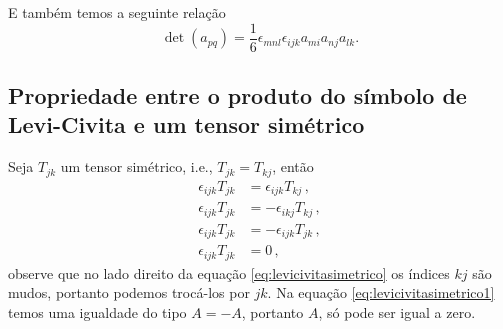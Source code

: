 E tamb\'em temos a seguinte rela\c{c}\~ao
\begin{equation}
\det(a_{pq})=\frac{1}{6}\epsilon_{mnl}\epsilon_{ijk}a_{mi}a_{nj}a_{lk}.
\end{equation}

\subsection{Propriedade entre o produto do s\'imbolo de Levi-Civita e um tensor sim\'etrico}
Seja $T_{jk}$ um tensor sim\'etrico, i.e., $T_{jk}=T_{kj}$, ent\~ao
\begin{align}
  \epsilon_{ijk}T_{jk} &= \epsilon_{ijk}T_{kj} \, ,\\
  \epsilon_{ijk}T_{jk} &= -\epsilon_{ikj}T_{kj} \, , \label{eq:levicivitasimetrico} \\
  \epsilon_{ijk}T_{jk} &= -\epsilon_{ijk}T_{jk}\, ,
  \label{eq:levicivitasimetrico1}\\ 
  \epsilon_{ijk}T_{jk} &= 0 \, ,
\end{align}
observe que no lado direito da equa\c{c}\~ao \ref{eq:levicivitasimetrico} os
\'indices $kj$ s\~ao mudos, portanto podemos troc\'a-los por $jk$. Na
equa\c{c}\~ao \ref{eq:levicivitasimetrico1} temos uma igualdade do tipo
$A=-A$, portanto $A$, s\'o pode ser igual a zero.


